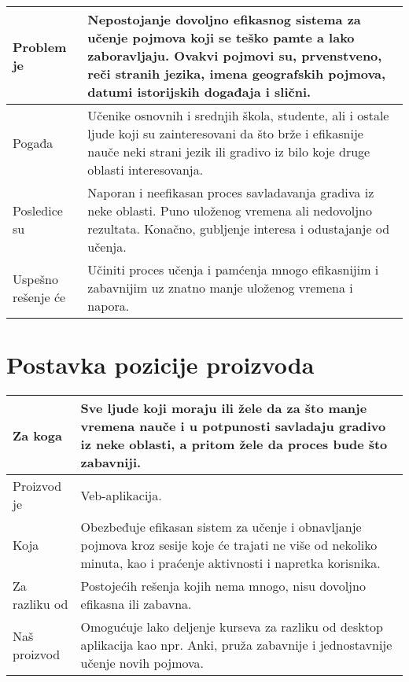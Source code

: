 \begin{center}
    \begin{tabular}{|>{\columncolor[gray]{0.8}}m{2cm}|m{6cm}|}
        \hline
        Problem je &
        Nepostojanje dovoljno efikasnog sistema za učenje pojmova koji se teško pamte a lako zaboravljaju.
        Ovakvi pojmovi su, prvenstveno, reči stranih jezika, imena geografskih pojmova, datumi istorijskih događaja i slični.\\
        \hline
        Pogađa &
        Učenike osnovnih i srednjih škola, studente, ali i ostale ljude koji su zainteresovani da što brže i efikasnije nauče neki strani jezik ili gradivo iz bilo koje druge oblasti interesovanja.\\
        \hline
        Posledice su &
        Naporan i neefikasan proces savladavanja gradiva iz neke oblasti.
        Puno uloženog vremena ali nedovoljno rezultata.
        Konačno, gubljenje interesa i odustajanje od učenja.\\
        \hline
        Uspešno rešenje će &
        Učiniti proces učenja i pamćenja mnogo efikasnijim i zabavnijim uz znatno manje uloženog vremena i napora.\\
        \hline
    \end{tabular}
\end{center}

\section{Postavka pozicije proizvoda}

\begin{center}
    \begin{tabular}{|>{\columncolor[gray]{0.8}}m{2cm}|m{6cm}|}
        \hline
        Za koga &
        Sve ljude koji moraju ili žele da za što manje vremena nauče i u potpunosti savladaju gradivo iz neke oblasti, a pritom žele da proces bude što zabavniji.\\
        \hline
        Proizvod je &
        Veb-aplikacija.\\
        \hline
        Koja &
        Obezbeđuje efikasan sistem za učenje i obnavljanje pojmova kroz sesije koje će trajati ne više od nekoliko minuta, kao i praćenje aktivnosti i napretka korisnika.\\
        \hline
        Za razliku od &
        Postojećih rešenja kojih nema mnogo, nisu dovoljno efikasna ili zabavna.\\
        \hline
        Naš proizvod &
        Omogućuje lako deljenje kurseva za razliku od desktop aplikacija kao npr. Anki, pruža zabavnije i jednostavnije učenje novih pojmova.
        \\
        \hline
    \end{tabular}
\end{center}

